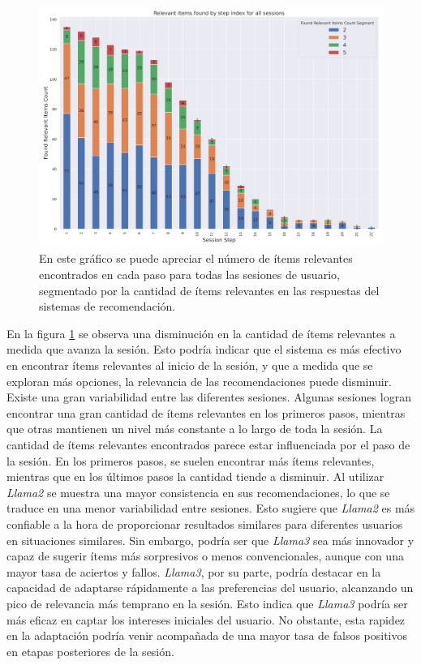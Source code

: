 \documentclass[11pt,a4paper,twoside]{thesis}
\begin{document}
\begin{figure}[H]
	\centering
	\includegraphics[width=15cm]{./images/llama3/relevant_items_found_by_step_index_for_all_sessions.png}
	\caption{En este gráfico se puede apreciar el número de ítems relevantes encontrados en cada paso
		para todas las sesiones de usuario, segmentado por la cantidad de ítems relevantes en
		las respuestas del sistemas de recomendación.}
	\label{fig:llama3-relevant_items_found_by_step_index_for_all_sessions}
\end{figure}


En la figura \ref{fig:llama3-relevant_items_found_by_step_index_for_all_sessions} se observa una disminución en la cantidad de ítems relevantes a medida que avanza la sesión. Esto podría indicar que el sistema es más efectivo en encontrar ítems relevantes al inicio de la sesión, y que a medida que se exploran más opciones, la relevancia de las recomendaciones puede disminuir. Existe una gran variabilidad entre las diferentes sesiones. Algunas sesiones logran encontrar una gran cantidad de ítems relevantes en los primeros pasos, mientras que otras mantienen un nivel más constante a lo largo de toda la sesión. La cantidad de ítems relevantes encontrados parece estar influenciada por el paso de la sesión. En los primeros pasos, se suelen encontrar más ítems relevantes, mientras que en los últimos pasos la cantidad tiende a disminuir.
Al utilizar \textit{Llama2} se muestra una mayor consistencia en sus recomendaciones, lo que se traduce en una menor variabilidad entre sesiones. Esto sugiere que \textit{Llama2} es más confiable a la hora de proporcionar resultados similares para diferentes usuarios en situaciones similares. Sin embargo, podría ser que \textit{Llama3} sea más innovador y capaz de sugerir ítems más sorpresivos o menos convencionales, aunque con una mayor tasa de aciertos y fallos.
\textit{Llama3}, por su parte, podría destacar en la capacidad de adaptarse rápidamente a las preferencias del usuario, alcanzando un pico de relevancia más temprano en la sesión. Esto indica que \textit{Llama3} podría ser más eficaz en captar los intereses iniciales del usuario. No obstante, esta rapidez en la adaptación podría venir acompañada de una mayor tasa de falsos positivos en etapas posteriores de la sesión.
\end{document}
